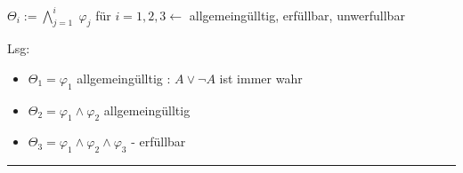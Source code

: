 \documentclass[8pt,landscape]{article}
\begin{document}
\begin{multicols}{3}
$ \Theta_{i} := \bigwedge^{i}_{j=1} \; \varphi_{j} $ f\"ur $ i = 1,2,3 \leftarrow $ allgemeing\"ulltig, erf\"ullbar, unwerfullbar

Lsg:
\begin{itemize}
\item $ \Theta_{1} = \varphi_{1} $ allgemeing\"ulltig : $  A \vee \neg A $ ist immer wahr
\item $ \Theta_{2} = \varphi_{1} \wedge \varphi_{2} $ allgemeing\"ulltig
\item $ \Theta_{3} = \varphi_{1} \wedge \varphi_{2} \wedge \varphi_{3} $ - erf\"ullbar
\end{itemize}

\rule{0.3\linewidth}{0.25pt}
\scriptsize
\end{multicols}
\end{document}
